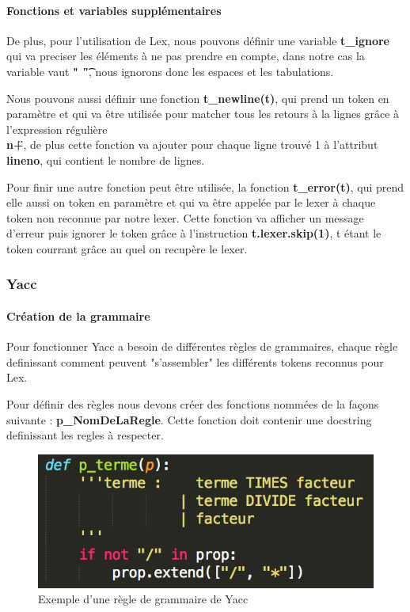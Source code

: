 \documentclass[a4paper,12pt]{article}
\begin{document}
			\paragraph{Fonctions et variables supplémentaires\\}

				De plus, pour l'utilisation de Lex, nous pouvons définir une variable \textbf{t\_ignore} qui va preciser les éléments à ne pas prendre en compte, dans notre cas la variable vaut \textbf{" \t"}, nous ignorons donc les espaces et les tabulations.

				Nous pouvons aussi définir une fonction \textbf{t\_newline(t)}, qui prend un token en paramètre et qui va être utilisée pour matcher tous les retours à la lignes grâce à l'expression régulière \textbf{\"\\n+\"}, de plus cette fonction va ajouter pour chaque ligne trouvé 1 à l'attribut \textbf{lineno}, qui contient le nombre de lignes.

				Pour finir une autre fonction peut être utilisée, la fonction \textbf{t\_error(t)}, qui prend elle aussi on token en paramètre et qui va être appelée par le lexer à chaque token non reconnue par notre lexer. Cette fonction va afficher un message d'erreur puis ignorer le token grâce à l'instruction \textbf{t.lexer.skip(1)}, t étant le token courrant grâce au quel on recupère le lexer. 

		\subsubsection{Yacc}

			\paragraph{Création de la grammaire}

				Pour fonctionner Yacc a besoin de différentes règles de grammaires, chaque règle definissant comment peuvent "s'assembler" les différents tokens reconnus pour Lex.

				Pour définir des règles nous devons créer des fonctions nommées de la façons suivante : \textbf{p\_NomDeLaRegle}. Cette fonction doit contenir une docstring definissant les regles à respecter.

				\begin{figure}[h!]
					\begin{center}
						\includegraphics[scale=1]{images/exp_grammaire_yacc}
						\caption{Exemple d'une règle de grammaire de Yacc}
					\end{center}
				\end{figure}
\end{document}
